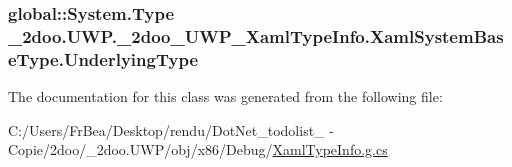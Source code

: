 \hypertarget{class__2doo_1_1_u_w_p_1_1__2doo___u_w_p___xaml_type_info_1_1_xaml_system_base_type_58577db9e23b7c809fe66d06813210ff}{
\subsubsection[{UnderlyingType}]{\setlength{\rightskip}{0pt plus 5cm}global::System.Type \_\-2doo.UWP.\_\-2doo\_\-UWP\_\-XamlTypeInfo.XamlSystemBaseType.UnderlyingType}}
\label{class__2doo_1_1_u_w_p_1_1__2doo___u_w_p___xaml_type_info_1_1_xaml_system_base_type_58577db9e23b7c809fe66d06813210ff}




The documentation for this class was generated from the following file:\begin{CompactItemize}
\item 
C:/Users/FrBea/Desktop/rendu/DotNet\_\-todolist\_ - Copie/2doo/\_\-2doo.UWP/obj/x86/Debug/\hyperlink{_xaml_type_info_8g_8cs}{XamlTypeInfo.g.cs}\end{CompactItemize}
